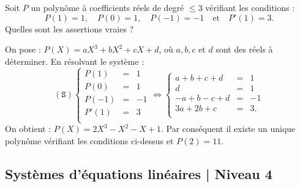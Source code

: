 \begin{question}
Soit $P$ un polynôme à coefficients réels de degré $\le 3$ vérifiant les conditions :
$$P(1)=1,\quad P(0)=1,\quad P(-1)=-1\quad \mbox{et}\quad P'(1)= 3.$$
Quelles sont les assertions vraies ?
\begin{answers}  
\end{answers}
\begin{explanations} On pose : $P(X)=aX^3+bX^2+cX+d$, où $a,b,c$ et $d$ sont des réels à déterminer. En résolvant le système :
$$(\mathtt{S})  
\left\{\begin{array}{rcc}
P(1)&=&1\\
P(0)&=&1\\ 
P(-1)&=&-1\\
P'(1)&=&3 \\
\end{array}\right.
\Leftrightarrow  
\left\{\begin{array}{rcc}
a+b+c+d&=&1\\
d&=&1\\ 
-a+b-c+d&=&-1\\
3a+2b+c&=&3. \\
\end{array}\right. $$
On obtient : $P(X)=2X^3-X^2-X+1$. Par conséquent il existe un unique polynôme vérifiant les conditions ci-dessus et $P(2)=11$.
\end{explanations}
\end{question}

\subsection{Systèmes d'équations linéaires | Niveau 4}


